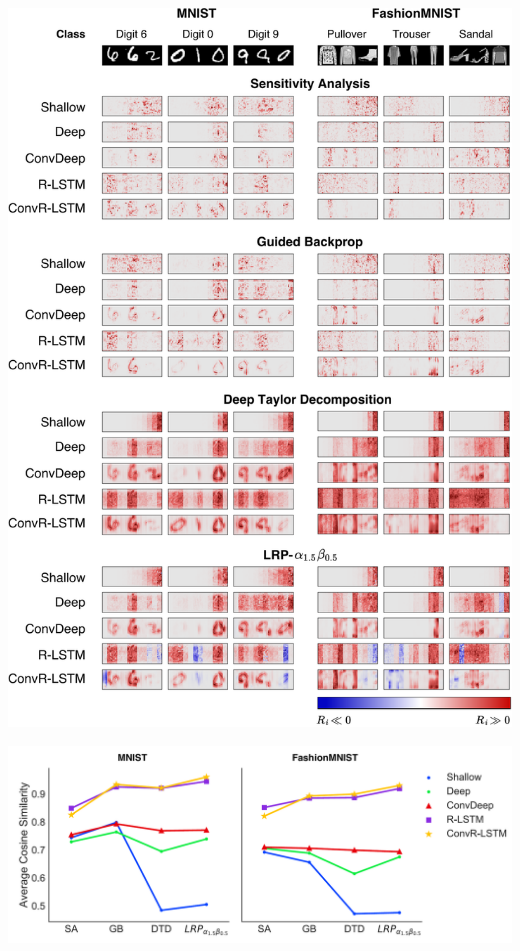 \documentclass[a0,portrait]{a0poster}
\begin{document}
\begin{multicols}{2}
\begin{center}\vspace{0.5cm}
\includegraphics[width=0.8\linewidth]{heatmap_msc_poster}
\end{center}\vspace{0.5cm}

\begin{center}\vspace{0.5cm}
\includegraphics[width=0.7\linewidth]{rel_dist_maj_for_poster}
\end{center}\vspace{0.5cm}




\end{multicols}
\end{document}
